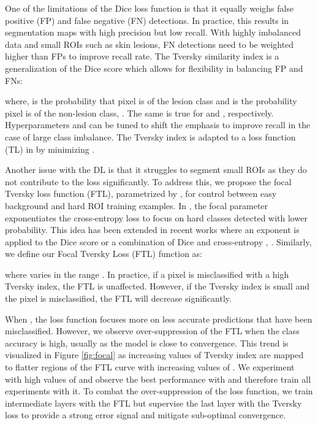 \documentclass{article}
\begin{document}
One of the limitations of the Dice loss function is that it equally weighs false positive (FP) and false negative (FN) detections. In practice, this results in segmentation maps with high precision but low recall. With highly imbalanced data and small ROIs such as skin lesions, FN detections need to be weighted higher than FPs to improve recall rate. The Tversky similarity index is a generalization of the Dice score which allows for flexibility in balancing FP and FNs:



where,  is the probability that pixel  is of the lesion class  and  is the probability pixel  is of the non-lesion class, . The same is true for  and , respectively. Hyperparameters  and  can be tuned to shift the emphasis to improve recall in the case of large class imbalance. The Tversky index is adapted to a loss function (TL) in \cite{tversky} by minimizing  . 

Another issue with the DL is that it struggles to segment small ROIs as they do not contribute to the loss significantly. To address this, we propose the focal Tversky loss function (FTL), parametrized by , for control between easy background and hard ROI training examples. In \cite{focalloss}, the focal parameter exponentiates the cross-entropy loss to focus on hard classes detected with lower probability. This idea has been extended in recent works where an exponent is applied to the Dice score \cite{wang} or a combination of Dice and cross-entropy \cite{wong}, \cite{zhu}. Similarly, we define our Focal Tversky Loss (FTL) function as:
 


where  varies in the range . In practice, if a pixel is misclassified with a high Tversky index, the FTL is unaffected. However, if the Tversky index is small and the pixel is misclassified, the FTL will decrease significantly. 

When , the loss function focuses more on less accurate predictions that have been misclassified. However, we observe over-suppression of the FTL when the class accuracy is high, usually as the model is close to convergence. This trend is visualized in Figure \ref{fig:focal} as increasing values of Tversky index are mapped to flatter regions of the FTL curve with increasing values of . We experiment with high values of  and observe the best performance with  and therefore train all experiments with it. To combat the over-suppression of the loss function, we train intermediate layers with the FTL but supervise the last layer with the Tversky loss to provide a strong error signal and mitigate sub-optimal convergence. 
\end{document}
